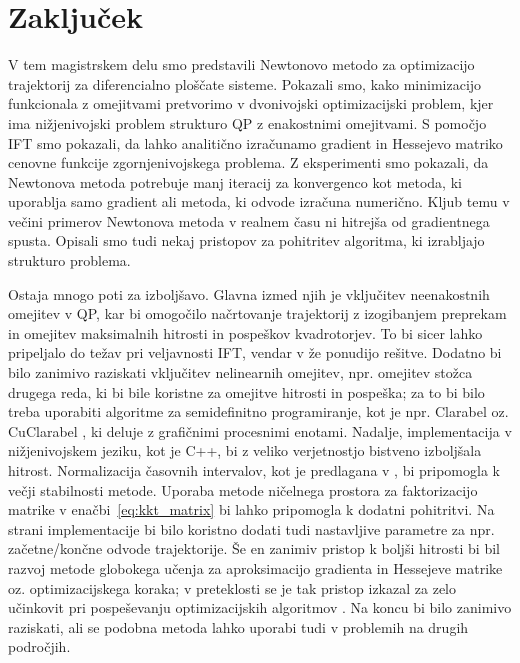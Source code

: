 \documentclass[isrm2, tisk]{fmfdelo}
\begin{document}
\section{Zaključek}
\label{sec:zakljucek}

V tem magistrskem delu smo predstavili Newtonovo metodo za optimizacijo trajektorij za diferencialno ploščate sisteme. Pokazali smo, kako minimizacijo funkcionala z omejitvami pretvorimo v dvonivojski optimizacijski problem, kjer ima nižjenivojski problem strukturo \ac{QP} z enakostnimi omejitvami. S pomočjo \ac{IFT} smo pokazali, da lahko analitično izračunamo gradient in Hessejevo matriko cenovne funkcije zgornjenivojskega problema. Z eksperimenti smo pokazali, da Newtonova metoda potrebuje manj iteracij za konvergenco kot metoda, ki uporablja samo gradient ali metoda, ki odvode izračuna numerično. Kljub temu v večini primerov Newtonova metoda v realnem času ni hitrejša od gradientnega spusta. Opisali smo tudi nekaj pristopov za pohitritev algoritma, ki izrabljajo strukturo problema.

Ostaja mnogo poti za izboljšavo. Glavna izmed njih je vključitev neenakostnih omejitev v \ac{QP}, kar bi omogočilo načrtovanje trajektorij z izogibanjem preprekam in omejitev maksimalnih hitrosti in pospeškov kvadrotorjev. To bi sicer lahko pripeljalo do težav pri veljavnosti \ac{IFT}, vendar v \cite{sun2021fast, amos2017optnet} že ponudijo rešitve. Dodatno bi bilo zanimivo raziskati vključitev nelinearnih omejitev, npr. omejitev stožca drugega reda, ki bi bile koristne za omejitve hitrosti in pospeška; za to bi bilo treba uporabiti algoritme za semidefinitno programiranje, kot je npr. Clarabel \cite{goulart2024clarabel} oz. CuClarabel \cite{chen2024cuclarabel}, ki deluje z grafičnimi procesnimi enotami. Nadalje, implementacija v nižjenivojskem jeziku, kot je C++, bi z veliko verjetnostjo bistveno izboljšala hitrost. Normalizacija časovnih intervalov, kot je predlagana v \cite{mellinger2011minimum}, bi pripomogla k večji stabilnosti metode. Uporaba metode ničelnega prostora za faktorizacijo matrike v enačbi~\eqref{eq:kkt_matrix} \cite{rees2014null} bi lahko pripomogla k dodatni pohitritvi. Na strani implementacije bi bilo koristno dodati tudi nastavljive parametre za npr. začetne/končne odvode trajektorije. Še en zanimiv pristop k boljši hitrosti bi bil razvoj metode globokega učenja za aproksimacijo gradienta in Hessejeve matrike oz. optimizacijskega koraka; v preteklosti se je tak pristop izkazal za zelo učinkovit pri pospeševanju optimizacijskih algoritmov \cite{andrychowicz2016learning}. Na koncu bi bilo zanimivo raziskati, ali se podobna metoda lahko uporabi tudi v problemih na drugih področjih.
\end{document}
